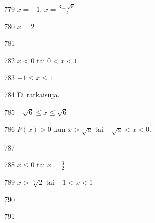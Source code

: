 \begin{Vastaus}{779}
		$x = -1$, $x = \frac{3\pm \sqrt{5}}{2}$
	
\end{Vastaus}
\begin{Vastaus}{780}
	$x=2$
	
\end{Vastaus}
\begin{Vastaus}{781}
    
\end{Vastaus}
\begin{Vastaus}{782}
        $x<0$ tai $0<x<1$
    
\end{Vastaus}
\begin{Vastaus}{783}
        $-1 \le x \le 1$
    
\end{Vastaus}
\begin{Vastaus}{784}
        Ei ratkaisuja.
    
\end{Vastaus}
\begin{Vastaus}{785}
        $-\sqrt{6}\le x \le \sqrt{6}$
    
\end{Vastaus}
\begin{Vastaus}{786}
	$P(x)>0$ kun $x > \sqrt{a}$ tai $-\sqrt{a}<x<0$.
    
\end{Vastaus}
\begin{Vastaus}{787}
    
\end{Vastaus}
\begin{Vastaus}{788}
        $x\le0$ tai $x=\frac{3}{2}$
    
\end{Vastaus}
\begin{Vastaus}{789}
$x > \sqrt[5]{2}$ tai $-1<x<1$
\end{Vastaus}
\begin{Vastaus}{790}
\end{Vastaus}
\begin{Vastaus}{791}
    
\end{Vastaus}
